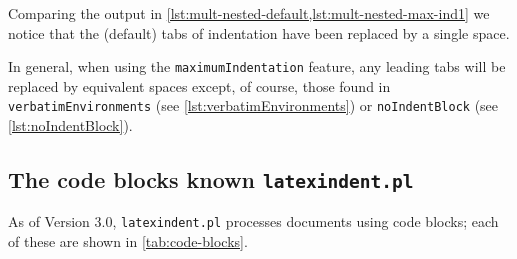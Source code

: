 	Comparing the output in \cref{lst:mult-nested-default,lst:mult-nested-max-ind1} we notice that the (default) tabs of indentation have been replaced by a single space.

	In general, when using the \texttt{maximumIndentation} feature, any leading tabs will be replaced by equivalent spaces except, of course, those found in \texttt{verbatimEnvironments} (see \vref{lst:verbatimEnvironments}) or \texttt{noIndentBlock} (see \vref{lst:noIndentBlock}).

\subsection{The code blocks known \texttt{latexindent.pl}}
	\label{subsubsec:code-blocks}
	As of Version 3.0, \texttt{latexindent.pl} processes documents using code blocks; each of these are shown in \cref{tab:code-blocks}.

